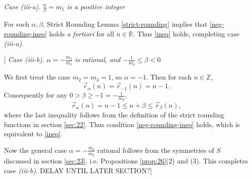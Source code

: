 \documentclass[12pt,letterpaper, reqno]{amsart}
\theoremstyle{definition}
\theoremstyle{remark}
\newcommand{\RR}{\ensuremath{\mathbb{R}}}
\newcommand{\ZZ}{\ensuremath{\mathbb{Z}}}
\newcommand{\floor}[1]{\lfloor{#1}\rfloor}
\newcommand{\tround}{\vec{r}}
\begin{document}
{\em Case {\it (iii-a)}.} {\em $\frac{\alpha}{\beta} = m_1$ is a positive integer}
\medskip

For such $\alpha,\beta$, Strict Rounding Lemma \ref{strict-rounding} implies that \eqref{neg-rounding-ineq} holds {\em a fortiori} for all $n\in\RR$.
Thus \eqref{ineq} holds, completing case {\it (iii-a)}.
\medskip



[ {\em Case {\it (iii-b)}.} {\em ${\alpha} = -\frac{m_2}{m_3}$ is rational, and $-\frac1{m_3}\leq\beta <0$}
\medskip

We first treat the case ${m_2}=m_3=1$, so $\alpha=-1$.
Then for each $n \in\ZZ$,  
\[ \vec{r}_\alpha(n) = \tround_{-1}(n) = n -1.\]
Consequently for any $0>\beta \geq -1 = -\frac1{m_3}$,
\[ \tround_\alpha(n) = n -1 \leq n + \beta \leq  \vec{r}_\beta(n),\]
where the last inequality follows from the definition of the strict rounding functions in section \ref{sec:22}.
Thus condition \eqref{neg-rounding-ineq} holds, which is equivalent to \eqref{ineq}.

Now the general case $\alpha = -\frac{m_2}{m_3}$ rational follows from the symmetries of $S$ discussed in section \ref{sec:23}, i.e. Propositions \ref{prop:26}(2) and (3).
This completes case {\it (iii-b)}. DELAY UNTIL LATER SECTION?]
\end{document}

